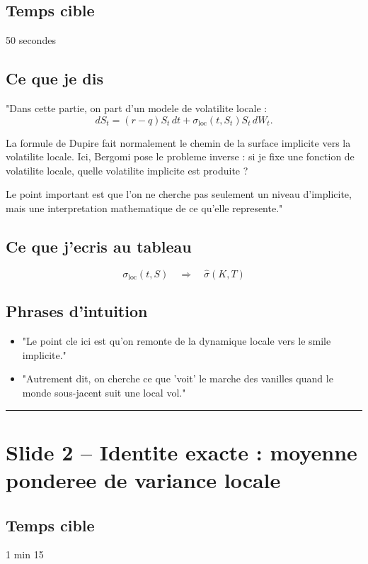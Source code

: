 \documentclass[11pt,a4paper]{article}
\begin{document}
\subsection{Temps cible}
50 secondes

\subsection{Ce que je dis}

"Dans cette partie, on part d'un modele de volatilite locale :
\[
dS_t=(r-q)S_t\,dt+\sigma_{\mathrm{loc}}(t,S_t)S_t\,dW_t.
\]

La formule de Dupire fait normalement le chemin de la surface implicite vers la volatilite locale. Ici, Bergomi pose le probleme inverse : si je fixe une fonction de volatilite locale, quelle volatilite implicite est produite ?

Le point important est que l'on ne cherche pas seulement un niveau d'implicite, mais une interpretation mathematique de ce qu'elle represente."

\subsection{Ce que j'ecris au tableau}

\[
\sigma_{\mathrm{loc}}(t,S)\quad \Longrightarrow \quad \hat{\sigma}(K,T)
\]

\subsection{Phrases d'intuition}

\begin{itemize}
\item "Le point cle ici est qu'on remonte de la dynamique locale vers le smile implicite."
\item "Autrement dit, on cherche ce que 'voit' le marche des vanilles quand le monde sous-jacent suit une local vol."
\end{itemize}

\bigskip\hrule\bigskip

\section{Slide 2 -- Identite exacte : moyenne ponderee de variance locale}

\subsection{Temps cible}
1 min 15
\end{document}
